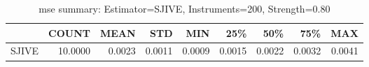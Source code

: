 \begin{table}[ht]
\centering
\caption{mse summary: Estimator=SJIVE, Instruments=200, Strength=0.80}
\begin{tabular}{lrrrrrrrr}
\toprule
 & COUNT & MEAN & STD & MIN & 25\% & 50\% & 75\% & MAX \\
\midrule
SJIVE & 10.0000 & 0.0023 & 0.0011 & 0.0009 & 0.0015 & 0.0022 & 0.0032 & 0.0041 \\
\bottomrule
\end{tabular}
\end{table}
